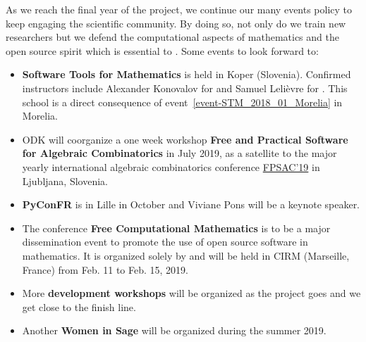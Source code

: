\documentclass{deliverablereport}
\begin{document}
As we reach the final year of the project, we continue our many events
policy to keep engaging the scientific community. By doing so,
not only do we train new researchers but we defend the computational aspects
of mathematics and the open source spirit which is essential to \ODK. 
Some events to look forward to:
\begin{itemize}
\item \textbf{Software Tools for Mathematics} is held in Koper (Slovenia). Confirmed
instructors include Alexander Konovalov for \GAP and Samuel Lelièvre for \Sage. This 
school is a direct consequence of event~\ref{event-STM_2018_01_Morelia} in Morelia.
\item ODK will coorganize a one week workshop \textbf{Free and
    Practical Software for Algebraic Combinatorics} in July 2019, as a
  satellite to the major yearly international algebraic combinatorics
  conference \href{http://fpsac2019.fmf.uni-lj.si/}{FPSAC'19} in
  Ljubljana, Slovenia.
\item \textbf{PyConFR} is in Lille in October and Viviane Pons will be a keynote speaker.
\item The conference \textbf{Free Computational Mathematics} is to be a major dissemination
event to promote the use of open source software in mathematics. It is organized solely by \ODK
and will be held in CIRM (Marseille, France) from Feb. 11 to Feb. 15, 2019.
\item More \textbf{development workshops} will be organized as the project goes and we get close
to the finish line.
\item Another \textbf{Women in Sage} will be organized during the summer 2019.
\end{itemize}


\newpage\printbibliography
\end{document}
